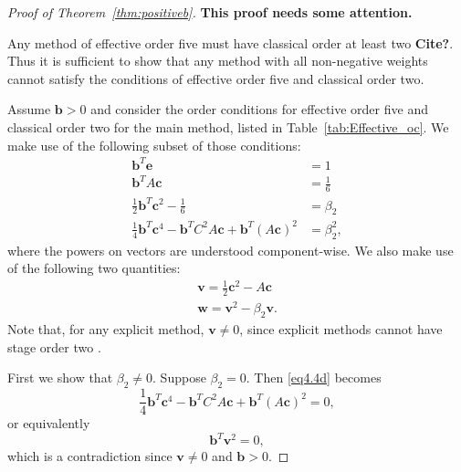 \begin{proof}[Proof of Theorem~\ref{thm:positiveb}]
    {\bf This proof needs some attention.}

    Any method of effective order five must have classical order at least two {\bf Cite?}.
    Thus it is sufficient to show that any method with all non-negative weights
    cannot satisfy the conditions of effective order five and classical order two.

    Assume $\bm{b}>0$ and consider the order conditions for effective order five and classical order two for the main method, listed in Table~\ref{tab:Effective_oc}.  We make use of the following subset of those conditions:
    \begin{subequations}\label{eq4.4}
        \begin{align}
            \bm{b}^{T}\bm{e} &= 1 \label{eq4.4a} \\
            \bm{b}^{T}A\bm{c} &= \frac{1}{6} \label{eq4.4b} \\
            \frac{1}{2}\bm{b}^{T}\bm{c}^{2} - \frac{1}{6} &= \beta_{2} \label{eq4.4c} \\
            \frac{1}{4}\bm{b}^{T}\bm{c}^{4} - \bm{b}^{T}C^{2}A\bm{c} + \bm{b}^{T}(A\bm{c})^{2} &= \beta_{2}^{2}, \label{eq4.4d}
        \end{align}
    \end{subequations}
    where the powers on vectors are understood component-wise. 
    We also make use of the following two quantities:
    \begin{align*} 
        \bm{v} = \frac{1}{2}\bm{c}^{2} - A\bm{c} \\
        \bm{w} = \bm{v}^{2} - \beta_{2}\bm{v}.
    \end{align*}
    Note that, for any explicit method, $\bm{v}\ne 0$, since explicit methods
    cannot have stage order two \cite{Kraaijevanger1991}.

    First we show that $\beta_2 \ne 0$.  Suppose $\beta_2=0$.
    Then \eqref{eq4.4d} becomes
    \begin{equation*}
        \frac{1}{4}\bm{b}^{T}\bm{c}^{4} - \bm{b}^{T}C^{2}A\bm{c} + \bm{b}^{T}(A\bm{c})^{2} = 0,
    \end{equation*}
    or equivalently
    \begin{equation*}
        \bm{b}^{T}\bm{v}^{2} = 0,
    \end{equation*}
    which is a contradiction since $\bm{v}\ne0$ and $\bm{b}>0$.


\end{proof}
